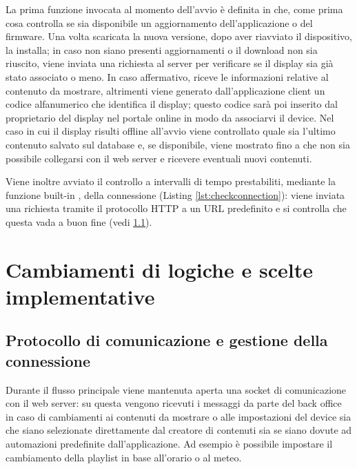 La prima funzione invocata al momento dell'avvio è  definita in  che, come prima cosa controlla se sia disponibile un aggiornamento dell'applicazione o del firmware. Una volta scaricata la nuova versione, dopo aver riavviato il dispositivo, la installa; in caso non siano presenti aggiornamenti o il download non sia riuscito, viene inviata una richiesta al server per verificare se il display sia già stato associato o meno. In caso affermativo, riceve le informazioni relative al contenuto da mostrare, altrimenti viene generato dall'applicazione client un codice alfanumerico che identifica il display; questo codice sarà poi inserito dal proprietario del display nel portale online in modo da associarvi il device. Nel caso in cui il display risulti offline all'avvio viene controllato quale sia l'ultimo contenuto salvato sul database e, se disponibile, viene mostrato fino a che non sia possibile collegarsi con il web server e ricevere eventuali nuovi contenuti.


Viene inoltre avviato il controllo a intervalli di tempo prestabiliti, mediante la funzione built-in , della connessione (Listing \ref*{lst:checkconnection}): viene inviata una richiesta tramite il protocollo HTTP a un URL predefinito e si controlla che questa vada a buon fine (vedi \ref*{connection}).



\section{Cambiamenti di logiche e scelte implementative}

\subsection{Protocollo di comunicazione e gestione della connessione}\label{connection}

Durante il flusso principale viene mantenuta aperta una socket di comunicazione con il web server: su questa vengono ricevuti i messaggi da parte del back office in caso di cambiamenti ai contenuti da mostrare o alle impostazioni del device sia che siano selezionate direttamente dal creatore di contenuti sia se siano dovute ad automazioni predefinite dall'applicazione. Ad esempio è possibile impostare il cambiamento della playlist in base all'orario o al meteo.

